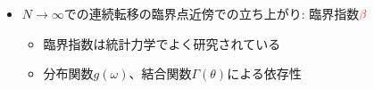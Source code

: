 \begin{frame}
\begin{figure}
  \end{figure}
  \begin{itemize}
    \item $N\to\infty$での連続転移の臨界点近傍での立ち上がり: 臨界指数$\color{red}\beta$
    \begin{itemize}
      \item 臨界指数は統計力学でよく研究されている
      \item 分布関数$g(\omega)$、結合関数$\Gamma(\theta)$による依存性
    \end{itemize}
  \end{itemize}
\end{frame}



